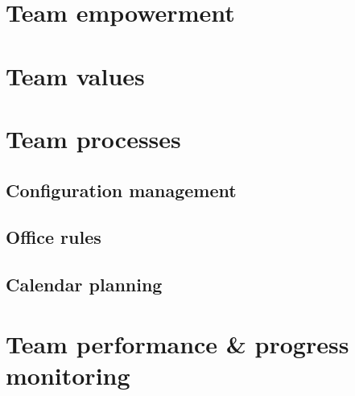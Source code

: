 \documentclass[a4paper,11pt]{article}
\begin{document}
\section{Team empowerment} %
\label{sec:team_empowerment}


\section{Team values} %
\label{sec:team_values}


\section{Team processes} %
\label{sec:team_processes}

\subsection{Configuration management} %
\label{subsec:configuration_management}


\subsection{Office rules} %
\label{subsec:office_rules}


\subsection{Calendar planning} %
\label{subsec:calendar_planning}



\section{Team performance \& progress monitoring} %
\label{sec:team_performance_progress_monitoring}

\end{document}
